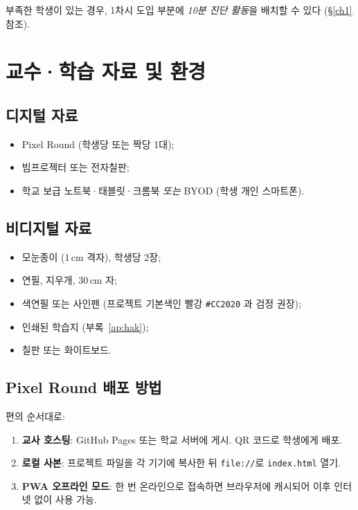 \documentclass[12pt,a4paper]{scrartcl}
\begin{document}
부족한 학생이 있는 경우, 1차시 도입 부분에 \emph{10분 진단 활동}을 배치할 수 있다 (§\ref{ch1} 참조).

\section{교수·학습 자료 및 환경}

\subsection{디지털 자료}
\begin{itemize}[leftmargin=1.3em,itemsep=0.15em,topsep=0.3em]
  \item Pixel Round (학생당 또는 짝당 1대);
  \item 빔프로젝터 또는 전자칠판;
  \item 학교 보급 노트북·태블릿·크롬북 \emph{또는} BYOD (학생 개인 스마트폰).
\end{itemize}

\subsection{비디지털 자료}
\begin{itemize}[leftmargin=1.3em,itemsep=0.15em,topsep=0.3em]
  \item 모눈종이 (1\,cm 격자), 학생당 2장;
  \item 연필, 지우개, 30\,cm 자;
  \item 색연필 또는 사인펜 (프로젝트 기본색인 빨강 \texttt{\#CC2020} 과 검정 권장);
  \item 인쇄된 학습지 (부록~\ref{ap:hak});
  \item 칠판 또는 화이트보드.
\end{itemize}

\subsection{Pixel Round 배포 방법}

편의 순서대로:

\begin{enumerate}[leftmargin=1.5em,itemsep=0.15em,topsep=0.3em]
  \item \textbf{교사 호스팅}: GitHub Pages 또는 학교 서버에 게시. QR 코드로 학생에게 배포.
  \item \textbf{로컬 사본}: 프로젝트 파일을 각 기기에 복사한 뒤 \texttt{file://}로 \texttt{index.html} 열기.
  \item \textbf{PWA 오프라인 모드}: 한 번 온라인으로 접속하면 브라우저에 캐시되어 이후 인터넷 없이 사용 가능.
\end{enumerate}
\end{document}
